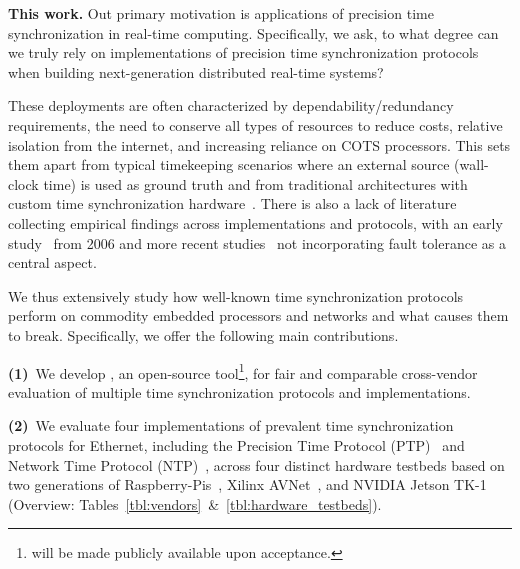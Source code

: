 \textbf{This work.}
Out primary motivation is applications of precision time synchronization in real-time computing.
Specifically, we ask, to what degree can we truly rely on implementations of precision time synchronization protocols
when building next-generation distributed real-time systems? %

These deployments %
are often %
characterized by dependability/redundancy requirements,
the need to conserve all types of resources to reduce costs,
relative isolation from the internet, %
and increasing reliance on COTS processors.
This sets them apart from typical timekeeping scenarios where an external source
(wall-clock time) is used as ground truth
and from traditional architectures with custom time synchronization hardware~\cite{wensley1978sift,hopkins1978ftmp}.
There is also a lack of literature collecting empirical findings
across implementations and protocols, with an early study~\cite{ntp-vs-ptp} from 2006
and more recent studies~\cite{time-enough} not incorporating fault tolerance as a central aspect.

We thus extensively study how well-known time synchronization protocols perform
on commodity embedded processors and networks and what causes them to break.
Specifically, we offer the following main contributions.

\textbf{(1)}~We develop \toolName{}, an open-source tool\footnote{\toolName{} will be made publicly available upon acceptance.}, for fair and comparable cross-vendor evaluation of multiple time synchronization protocols and implementations.

\textbf{(2)}~We evaluate %
four implementations of prevalent time synchronization protocols for Ethernet, %
including the Precision Time Protocol (PTP)~\cite{ptp-spec} and Network Time Protocol (NTP)~\cite{ntpv4-spec},
across four distinct hardware testbeds
based on two generations of Raspberry-Pis~\cite{??, ??},
Xilinx AVNet~\cite{??}, and NVIDIA Jetson TK-1~\cite{??} (Overview: Tables~\ref{tbl:vendors}~\&~\ref{tbl:hardware_testbeds}).

